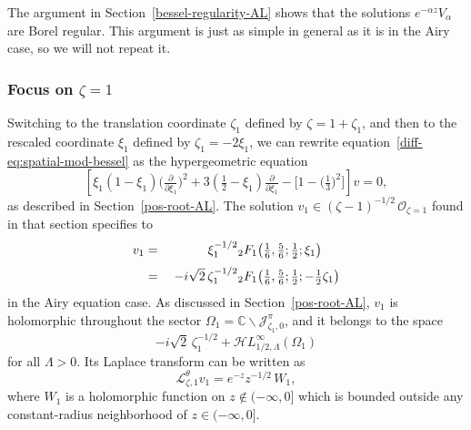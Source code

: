 \documentclass{article}
\newcommand{\singexp}[2]{\mathcal{H}L^\infty_{#1, #2}}
\newcommand{\C}{\mathbb{C}}
\newcommand{\laplace}{\mathcal{L}}
\theoremstyle{definition}
\theoremstyle{plain}
\begin{document}
The argument in Section~\ref{bessel-regularity-AL} shows that the solutions $e^{-\alpha z} V_\alpha$ are Borel regular. This argument is just as simple in general as it is in the Airy case, so we will not repeat it.
%
\subsubsection{Focus on $\zeta = 1$}\label{pos-root}
%
Switching to the translation coordinate $\zeta_1$ defined by $\zeta = 1 + \zeta_1$, and then to the rescaled coordinate $\xi_1$ defined by $\zeta_1 = -2\xi_1$, we can rewrite equation~\eqref{diff-eq:spatial-mod-bessel} as the hypergeometric equation
\begin{equation}%
\left[\xi_1 (1 - \xi_1) \big(\tfrac{\partial}{\partial \xi_1}\big)^2 + 3(\tfrac{1}{2} - \xi_1) \tfrac{\partial}{\partial \xi_1} - \big[1 - \big(\tfrac{1}{3}\big)^2\big]\right] v = 0,
\end{equation}
as described in Section~\ref{pos-root-AL}. The solution $v_1 \in (\zeta-1)^{-1/2}\,\mathcal{O}_{\zeta=1}$ found in that section specifies to
\begin{alignat*}{2}
v_1 &=\;& \hphantom{-i\sqrt{2}}\,\xi_1^{-1/2} & {}_2F_1\big(\tfrac{1}{6}, \tfrac{5}{6}; \tfrac{1}{2}; \xi_1\big) \\[1mm]
&=\;& -i\sqrt{2}\,\zeta_1^{-1/2} & {}_2F_1\big(\tfrac{1}{6}, \tfrac{5}{6}; \tfrac{1}{2}; -\tfrac{1}{2}\zeta_1\big)
\end{alignat*}
in the Airy equation case. As discussed in Section~\ref{pos-root-AL}, $v_1$ is holomorphic throughout the sector $\Omega_1 = \C \smallsetminus \mathcal{J}^\pi_{\zeta_1, 0}$, and it belongs to the space
\[ -i\sqrt{2}\,\zeta_1^{-1/2} + \singexp{1/2}{\Lambda}(\Omega_1) \]
for all $\Lambda > 0$. Its Laplace transform can be written as
\[ \laplace^\theta_{\zeta, 1} v_1 = e^{-z} z^{-1/2}\,W_1, \]
where $W_1$ is a holomorphic function on $z \notin (-\infty, 0]$ which is bounded outside any constant-radius neighborhood of $z \in (-\infty, 0]$.
%
\end{document}
